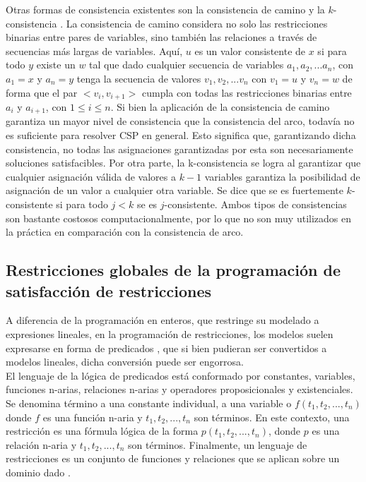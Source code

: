 \documentclass[12pt]{report}
\begin{document}
Otras formas de consistencia existentes son la consistencia de camino \cite{camino} y la $k$-consistencia \cite{kcons}. La consistencia de camino considera no solo las restricciones binarias entre pares de variables, sino también las relaciones a través de secuencias más largas de variables. Aquí, $u$ es un valor consistente de $x$ si para todo $y$ existe un $w$ tal que dado cualquier secuencia de variables $a_1, a_2, ... a_n$, con $a_1=x$ y $a_n=y$ tenga la secuencia de valores $v_1, v_2, ... v_n$ con $v_1=u$ y $v_n=w$ de forma que el par $<v_i,v_{i+1}>$ cumpla con todas las restricciones binarias entre $a_i$ y $a_{i+1}$, con $1\leq  i \leq  n$. Si bien la aplicación de la consistencia de camino garantiza un mayor nivel de consistencia que la consistencia del arco, todavía no es suficiente para resolver CSP en general. Esto significa que, garantizando dicha consistencia, no todas las asignaciones garantizadas por esta son necesariamente soluciones satisfacibles. Por otra parte, la k-consistencia se logra al garantizar que cualquier asignación válida de valores a $k-1$ variables garantiza la posibilidad de asignación de un valor a cualquier otra variable. Se dice que se es fuertemente $k$-consistente si para todo $j<k$ se es $j$-consistente. Ambos tipos de consistencias son bastante costosos computacionalmente, por lo que no son muy utilizados en la práctica en comparación con la consistencia de arco.\\

\subsection{Restricciones globales de la programación de satisfacción de restricciones}

A diferencia de la programación en enteros, que restringe su modelado a expresiones lineales, en la programación de restricciones, los modelos suelen expresarse en forma de predicados \cite{Williams}, que si bien pudieran ser convertidos a modelos lineales, dicha conversión puede ser engorrosa. \\

El lenguaje de la lógica de predicados está conformado por constantes, variables, funciones n-arias, relaciones n-arias y operadores proposicionales y existenciales. Se denomina término a una constante individual, a una variable o $f(t_1,t_2,...,t_n)$ donde $f$ es una función n-aria y $t_1,t_2,...,t_n$ son términos. En este contexto, una restricción es una fórmula lógica de la forma $p(t_1,t_2,...,t_n)$, donde $p$ es una relación n-aria y $t_1,t_2,...,t_n$ son términos. Finalmente, un lenguaje de restricciones es un conjunto de funciones y relaciones que se aplican sobre un dominio dado \cite{Luciano}. \\
\end{document}
